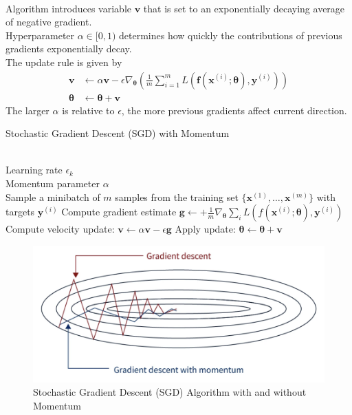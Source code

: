 \begin{remark} \\
Algorithm introduces variable $\bm{v}$ that is set to an exponentially decaying average of negative gradient.\\
Hyperparameter $\alpha \in [0, 1)$ determines how quickly the contributions of previous gradients exponentially decay.\\
The update rule is given by
\begin{align}
\bm{v} &\leftarrow \alpha \bm{v} - \epsilon \nabla_{\bm{\theta}} \left(\frac{1}{m} \sum\limits_{i=1}^m L(\bm{f}(\bm{x}^{(i)}; \bm{\theta}), \bm{y}^{(i)}) \right) \nonumber \\
\bm{\theta} &\leftarrow \bm{\theta} + \bm{v} \nonumber
\end{align}
The larger $\alpha$ is relative to $\epsilon$, the more previous gradients affect current direction.
\end{remark}

\begin{breakablealgorithm}
\caption{Stochastic Gradient Descent (SGD) with Momentum}
\begin{algorithmic}
\Require \\
Learning rate $\epsilon_k$\\
Momentum parameter $\alpha$\\

\State Sample a minibatch of $m$ samples from the training set $\{\bm{x}^{(1)}, \ldots, \bm{x}^{(m)} \}$ with targets $\bm{y}^{(i)}$
\State Compute gradient estimate $\bm{g} \leftarrow + \frac{1}{m} \nabla_{\bm{\theta}} \sum_{i} L(f(\bm{x}^{(i)}; \bm{\theta}), \bm{y}^{(i)})$
\State Compute velocity update: $\bm{v} \leftarrow \alpha \bm{v} - \epsilon \bm{g}$
\State Apply update: $\bm{\theta} \leftarrow \bm{\theta} + \bm{v}$
\EndWhile
\end{algorithmic}
\end{breakablealgorithm}

\begin{figure}[H]
\centering
\includegraphics[scale=0.4]{figures/math/stochasticgradientdescent}
\caption{Stochastic Gradient Descent (SGD) Algorithm with and without Momentum}
\end{figure}

